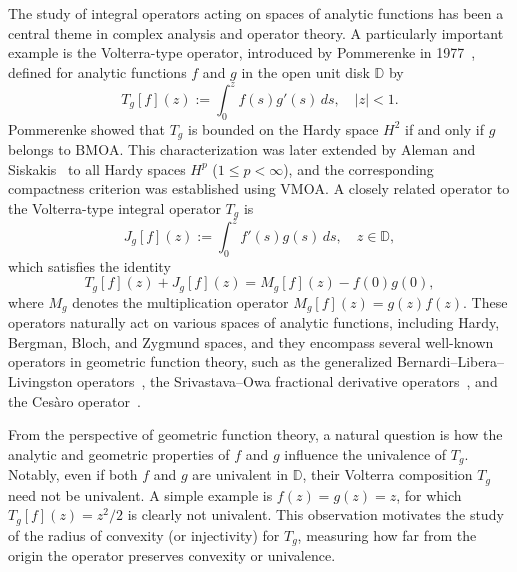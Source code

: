 \documentclass[12pt,a4paper]{amsart}
\numberwithin{equation}{section}
\theoremstyle{remark}
\begin{document}
The study of integral operators acting on spaces of analytic functions has been a central theme in complex analysis and operator theory. A particularly important example is the Volterra-type operator, introduced by Pommerenke in 1977~\cite{Pommerenke1977}, defined for analytic functions \(f\) and \(g\) in the open unit disk \(\mathbb{D}\) by
\begin{equation}\label{eq:Tg}
T_g[f](z):= \int_0^z f(s) g'(s)\, ds, \quad |z|<1.
\end{equation}
Pommerenke showed that \(T_g\) is bounded on the Hardy space \(H^2\) if and only if \(g\) belongs to \(\mathrm{BMOA}\). This characterization was later extended by Aleman and Siskakis~\cite{Aleman} to all Hardy spaces \(H^p\) (\(1 \le p < \infty\)), and the corresponding compactness criterion was established using \(\mathrm{VMOA}\).
A closely related operator to the Volterra-type integral operator $T_g$ is
\begin{equation*}
J_g[f](z) := \int_0^z f'(s) g(s)\, ds, \quad z\in\mathbb{D},
\end{equation*}
which satisfies the identity
\[
T_g[f](z) + J_g[f](z) = M_g [f](z) - f(0) g(0),
\]
where \(M_g\) denotes the multiplication operator \(M_g [f](z)=g(z) f(z)\). %
These operators naturally act on various spaces of analytic functions, including Hardy, Bergman, Bloch, and Zygmund spaces, and they encompass several well-known operators in geometric function theory, such as the generalized Bernardi--Libera--Livingston operators~\cite{Bernardi,Libera,Livingston}, the Srivastava--Owa fractional derivative operators~\cite{Owa1978,OwaSri}, and the Ces\`{a}ro operator~\cite{Siskakis1987,Siskakis1990}.  

From the perspective of geometric function theory, a natural question is how the analytic and geometric properties of \(f\) and \(g\) influence the univalence of \(T_g\). Notably, even if both \(f\) and \(g\) are univalent in \(\mathbb{D}\), their Volterra composition \(T_g\) need not be univalent. A simple example is \(f(z)=g(z)=z\), for which \(T_g[f](z)=z^2/2\) is clearly not univalent. This observation motivates the study of the radius of convexity (or injectivity) for \(T_g\), measuring how far from the origin the operator preserves convexity or univalence.
\end{document}
